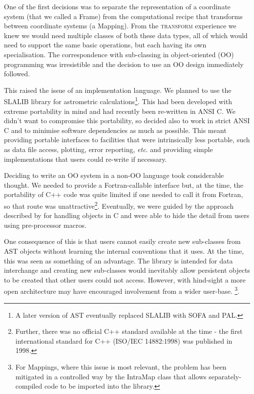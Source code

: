 \documentclass[final,authoryear,5p,times,twocolumn]{elsarticle}
\begin{document}
One of the first decisions was to
separate the representation of a coordinate system (that we called a
Frame) from the computational recipe that transforms between
coordinate systems (a Mapping). From the \textsc{transform} experience
we knew we would need multiple classes of both these data types, all
of which would need to support the same basic operations, but each
having its own specialisation. The correspondence with sub-classing in
object-oriented (OO) programming was irresistible and the decision to
use an OO design immediately followed.

This raised the issue of an implementation language. We planned to use
the SLALIB library for astrometric calculations\footnote{A later version
of AST eventually replaced SLALIB with SOFA and PAL.}. This had been
developed with extreme portability in mind and had recently been
re-written in ANSI C. We didn't want to compromise this portability,
so decided also to work in strict ANSI C and to minimise software
dependencies as much as possible. This meant providing portable
interfaces to facilities that were intrinsically less portable, such
as data file access, plotting, error reporting, \emph{etc}. and providing
simple implementations that users could re-write if necessary.

Deciding to write an OO system in a non-OO language took considerable
thought. We needed to provide a Fortran-callable interface but, at the
time, the portability of C++ code was quite limited if one needed to
call it from Fortran, so that route was unattractive\footnote{Further, there
was no official C++ standard available at the time - the first international
standard for C++ (ISO/IEC 14882:1998) was published in 1998.}. Eventually, we
were guided by the approach described by \citet{1992Holub} for
handling objects in C and were able to hide the detail from users
using pre-processor macros.

One consequence of this is that users cannot easily create new
sub-classes from AST objects without learning the internal conventions
that it uses. At the time, this was seen as something of an advantage.
The library is intended for data interchange and creating new
sub-classes would inevitably allow persistent objects to be created
that other users could not access. However, with hind-sight a more open
architecture may have encouraged involvement from a wider user-base.
\footnote{For Mappings, where this
  issue is most relevant, the problem has been mitigated in a
  controlled way by the IntraMap class that allows separately-compiled
  code to be imported into the library.}.
\end{document}
